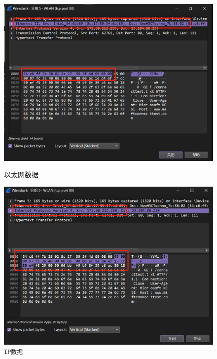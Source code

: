 \documentclass{article}
\begin{document}
	\begin{figure}[H]
		\centering
		\begin{minipage}[b]{0.45\textwidth}
			\includegraphics[width=\textwidth]{images/8.以太网数据.png}
			\caption{以太网数据}
		\end{minipage}
		\hfill
		\begin{minipage}[b]{0.45\textwidth}
			\includegraphics[width=\textwidth]{images/9.IP数据.png}
			\caption{\texttt{IP数据}}
		\end{minipage}
	\end{figure}
	
\end{document}
